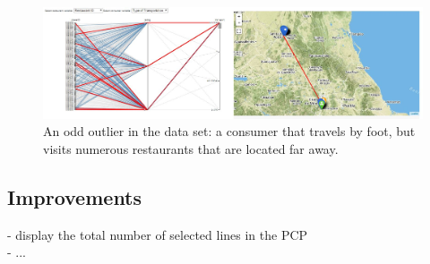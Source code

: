\begin{figure}[h]
    \centering
    \captionsetup{justification=centering,margin=0.5cm}
    \includegraphics[width=.8\textwidth]{img/task2q5.jpg}
    \caption{An odd outlier in the data set: a consumer that travels by foot, but visits numerous restaurants that are located far away.}
    \label{fig:task2q5}
\end{figure}


\subsection{Improvements}\label{sec:improvements}
- display the total number of selected lines in the PCP
\\- ...






